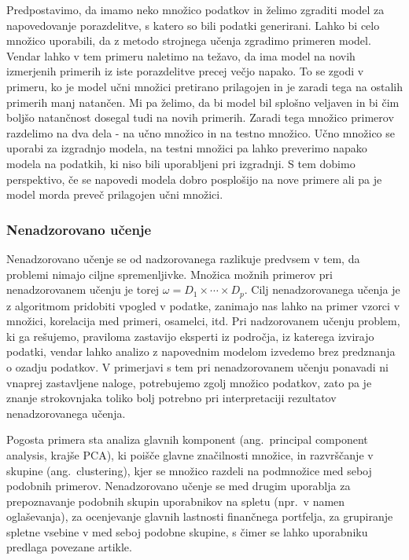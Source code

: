 \documentclass[12pt,a4paper,twoside]{article}
\theoremstyle{definition} %
\theoremstyle{plain} %
\numberwithin{equation}{section}  %
\begin{document}
Predpostavimo, da imamo neko množico podatkov in želimo zgraditi model za napovedovanje porazdelitve, s katero so bili podatki generirani. 
Lahko bi celo množico uporabili, da z metodo strojnega učenja zgradimo primeren model. 
Vendar lahko v tem primeru naletimo na težavo, da ima model na novih izmerjenih primerih iz iste porazdelitve precej večjo napako. 
To se zgodi v primeru, ko je model učni množici pretirano prilagojen in je zaradi tega na ostalih primerih manj natančen. 
Mi pa želimo, da bi model bil splošno veljaven in bi čim boljšo natančnost dosegal tudi na novih primerih. 
Zaradi tega množico primerov razdelimo na dva dela - na učno množico in na testno množico. 
Učno množico se uporabi za izgradnjo modela, na testni množici pa lahko preverimo napako modela na podatkih, ki niso bili uporabljeni pri izgradnji. 
S tem dobimo perspektivo, če se napovedi modela dobro posplošijo na nove primere ali pa je model morda preveč prilagojen učni množici.



\subsubsection{Nenadzorovano učenje}

Nenadzorovano učenje se od nadzorovanega razlikuje predvsem v tem, da problemi nimajo ciljne spremenljivke. 
Množica možnih primerov pri nenadzorovanem učenju je torej $\omega = D_1 \times \cdots \times D_p$.
Cilj nenadzorovanega učenja je z algoritmom pridobiti vpogled v podatke, zanimajo nas lahko na primer vzorci v množici, korelacija med primeri, osamelci, itd.
Pri nadzorovanem učenju problem, ki ga rešujemo, praviloma zastavijo eksperti iz področja, iz katerega izvirajo podatki, vendar lahko analizo z napovednim modelom izvedemo brez predznanja o ozadju podatkov.
V primerjavi s tem pri nenadzorovanem učenju ponavadi ni vnaprej zastavljene naloge, potrebujemo zgolj množico podatkov, zato pa je znanje strokovnjaka toliko bolj potrebno pri interpretaciji rezultatov nenadzorovanega učenja.

Pogosta primera sta analiza glavnih komponent (ang.~principal component analysis, krajše PCA), ki poišče glavne značilnosti množice, 
in razvrščanje v skupine (ang.~clustering), kjer se množico razdeli na podmnožice med seboj podobnih primerov. 
Nenadzorovano učenje se med drugim uporablja za prepoznavanje podobnih skupin uporabnikov na spletu (npr.\ v namen oglaševanja), 
za ocenjevanje glavnih lastnosti finančnega portfelja, za grupiranje spletne vsebine v med seboj podobne skupine, s čimer se lahko uporabniku predlaga povezane artikle.
\end{document}
